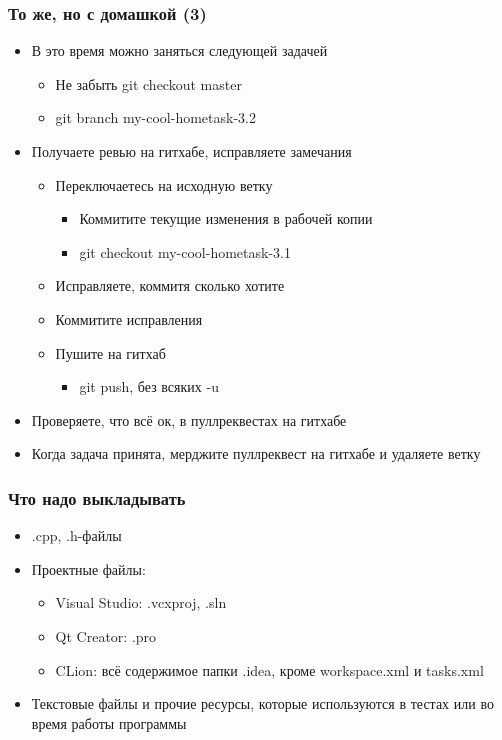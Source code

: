 \documentclass[xetex,mathserif,serif]{beamer}
\begin{document}
	\begin{frame}
		\frametitle{То же, но с домашкой (3)}
		\begin{itemize}
			\item В это время можно заняться следующей задачей
			\begin{itemize}
				\item Не забыть git checkout master
				\item git branch my-cool-hometask-3.2
			\end{itemize}
			\item Получаете ревью на гитхабе, исправляете замечания
			\begin{itemize}
				\item Переключаетесь на исходную ветку
				\begin{itemize}
					\item Коммитите текущие изменения в рабочей копии
					\item git checkout my-cool-hometask-3.1
				\end{itemize}
				\item Исправляете, коммитя сколько хотите
				\item Коммитите исправления
				\item Пушите на гитхаб
				\begin{itemize}
					\item git push, без всяких -u
				\end{itemize}
			\end{itemize}
			\item Проверяете, что всё ок, в пуллреквестах на гитхабе
			\item Когда задача принята, мерджите пуллреквест на гитхабе и удаляете ветку
		\end{itemize}
	\end{frame}

	\begin{frame}
		\frametitle{Что надо выкладывать}
		\begin{itemize}
			\item .cpp, .h-файлы
			\item Проектные файлы:
			\begin{itemize}
				\item Visual Studio: .vcxproj, .sln
				\item Qt Creator: .pro
				\item CLion: всё содержимое папки .idea, кроме workspace.xml и tasks.xml
			\end{itemize}
			\item Текстовые файлы и прочие ресурсы, которые используются в тестах или во время работы программы
		\end{itemize}
	\end{frame}
\end{document}
